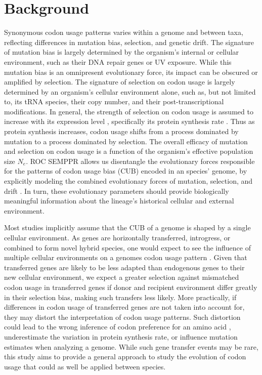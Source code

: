 \documentclass[doublespacing,linenumbers]{bmcart}
\newcommand{\ROC}{ROC SEMPPR\xspace}
\newcommand{\Ne}{\ensuremath{N_e}\xspace}
\begin{document}
\section*{Background}
Synonymous codon usage patterns varies within a genome and between taxa, reflecting differences in mutation bias, selection, and genetic drift.
The signature of mutation bias is largely determined by the organism's internal or cellular environment, such as their DNA repair genes or UV exposure.
While this mutation bias is an omnipresent evolutionary force, its impact can be obscured or amplified by selection. 
The signature of selection on codon usage is largely determined by an organism's cellular environment alone, such as, but not limited to, its tRNA species, their copy number, and their post-transcriptional modifications.
In general, the strength of selection on codon usage is assumed to increase with its expression level \citep{gouy1982, ikemura1985, bulmer1990}, specifically its protein synthesis rate \citep{gilchrist2007}.
Thus as protein synthesis increases, codon usage shifts from a process dominated by mutation to a process dominated by selection.
The overall efficacy of mutation and selection on codon usage is a function of the organism's effective population size $\Ne$.
\ROC allows us disentangle the evolutionary forces responsible for the patterns of codon usage bias (CUB) encoded in an species' genome, by explicitly modeling the combined evolutionary forces of mutation, selection, and drift \citep{gilchrist2007, ShahAndGilchrist2011, wallace2013, gilchrist2015}.
In turn, these evolutionary parameters should provide biologically meaningful information about the lineage's historical cellular and external environment.

Most studies implicitly assume that the CUB of a genome is shaped by a single cellular environment. 
As genes are horizontally transferred, introgress, or combined to form novel hybrid species, one would expect to see the influence of multiple cellular environments on a genomes codon usage pattern \citep{medigue1991, lawrence1997}.
Given that transferred genes are likely to be less adapted than endogenous genes to their new cellular environment, we expect a greater selection against mismatched codon usage in transferred genes if donor and recipient environment differ greatly in their selection bias, making such transfers less likely.
More practically, if differences in codon usage of transferred genes are not taken into account for, they may distort the interpretation of codon usage patterns.
Such distortion could lead to the wrong inference of codon preference for an amino acid \citep{ShahAndGilchrist2011, gilchrist2015}, underestimate the variation in protein synthesis rate, or influence mutation estimates when analyzing a genome.
While such gene transfer events may be rare, this study aims to provide a general approach to study the evolution of codon usage that could as well be applied between species.
\end{document}
